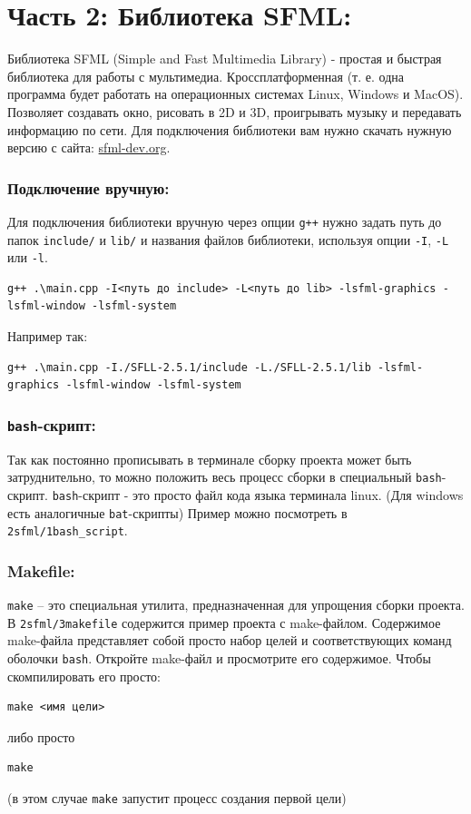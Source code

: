 \documentclass{article}
\begin{document}
\newpage
\section*{Часть 2: Библиотека SFML:}
Библиотека SFML (Simple and Fast Multimedia Library) - простая и быстрая библиотека для работы с мультимедиа. Кроссплатформенная (т. е. одна программа будет работать на операционных системах Linux, Windows и MacOS). Позволяет создавать окно, рисовать в 2D и 3D, проигрывать музыку и передавать информацию по сети. Для подключения библиотеки вам нужно скачать нужную версию с сайта: \href{https://www.sfml-dev.org/}{sfml-dev.org}.

\subsubsection*{Подключение вручную:}
Для подключения библиотеки вручную через опции \texttt{g++} нужно задать путь до папок \texttt{include/} и \texttt{lib/} и названия файлов библиотеки, используя опции \texttt{-I}, \texttt{-L} или \texttt{-l}. 
\begin{verbatim}
g++ .\main.cpp -I<путь до include> -L<путь до lib> -lsfml-graphics -lsfml-window -lsfml-system
\end{verbatim}
Например так:
\begin{verbatim}
g++ .\main.cpp -I./SFLL-2.5.1/include -L./SFLL-2.5.1/lib -lsfml-graphics -lsfml-window -lsfml-system
\end{verbatim}

\subsubsection*{\texttt{bash}-скрипт:} Так как постоянно прописывать в терминале сборку проекта может быть затруднительно, то можно положить весь процесс сборки в специальный \texttt{bash}-скрипт. \texttt{bash}-скрипт - это просто файл кода языка терминала linux. (Для windows есть аналогичные \texttt{bat}-скрипты) Пример можно посмотреть в \texttt{2sfml/1bash\_script}.

\subsubsection*{Makefile:} \texttt{make} -- это специальная утилита, предназначенная для упрощения сборки проекта. В \texttt{2sfml/3makefile} содержится пример проекта с make-файлом. Содержимое make-файла представляет собой просто набор целей и соответствующих команд оболочки \texttt{bash}. Откройте make-файл и просмотрите его содержимое. Чтобы скомпилировать его просто:
\begin{verbatim}
make <имя цели>
\end{verbatim}
либо просто
\begin{verbatim}
make
\end{verbatim}
(в этом случае \texttt{make} запустит процесс создания первой цели)
\end{document}

